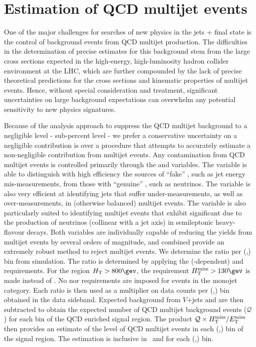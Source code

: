 \section{Estimation of QCD multijet events \label{sec:qcd}}

One of the major challenges for searches of new physics in the jets + \met final state is the control of background events from QCD multijet
production. The difficulties in the determination of precise estimates for this background stem from the large cross sections expected in the
high-energy, high-luminosity hadron collider environment at the LHC, which are further compounded by the lack of precise theoretical
predictions for the cross sections and kinematic properties of multijet events. Hence, without special consideration and treatment,
significant uncertainties on large background expectations can overwhelm any potential sensitivity to new physics signatures.


Because of the analysis approach to suppress the QCD multijet background to a
negligible level -   sub-percent level -  we prefer a conservative uncertainty on a negligible contribution is
 over a procedure that attempts to accurately estimate a
non-negligible contribution from multijet events. 
Any contamination from QCD multijet events is controlled primarily through the \alphat and \bdphi variables. The \alphat variable is able
to distinguish with high efficiency the sources of ``fake'' \met, such as jet energy mis-measurements, from those with ``genuine'' \met, such
as neutrinos. The \bdphi variable is also very efficient at identifying jets that suffer under-measurements, as well as
over-measurements, in (otherwise balanced) multijet events. The variable is also particularly suited to identifying multijet events
that exhibit significant \met due to the production of neutrinos (collinear with a jet axis) in semileptonic heavy-flavour decays. Both
variables are individually capable of reducing the yields from multijet events by several orders of magnitude, and combined provide
an extremely robust method to reject multijet events. 
We determine the ratio \rmhtmet per (\njet,\scalht) bin from simulation. The ratio is determined by applying the (\scalht-dependent)
\alphat and \bdphi requirements. For the region $\scalht > 800\gev$, the requirement $\mht > 130\gev$ is made instead of \alphat. 
No \alphat nor \mht requirements are imposed for events in the monojet category.
Each ratio \rmhtmet is then used as a multiplier on data counts per (\njet,\scalht) bin obtained in the
\mhtmet data sideband. Expected background from $V$+jets and \ttbar are then subtracted to obtain the expected number of 
QCD multijet background events ($\mathcal{Q}$) for each bin of the QCD enriched signal region.
The product $\mathcal{Q} \times \mbox{$\mbox{$H_{\rm T}^{\rm miss}$} / \mbox{$E_\text{T}^{\rm miss}$}$}$ then provides an estimate of the level of QCD multijet events in
each (\njet,\scalht) bin of the signal region. The estimation is inclusive in \nb\ and \mht for each
(\njet,\scalht) bin. 



